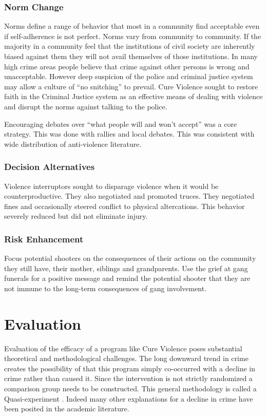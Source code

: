 \documentclass[11pt]{article}
\begin{document}
\subsubsection{Norm Change}
\label{sec-2-5-1}

Norms define a range of behavior that most in a community find acceptable even if self-adherence is 
not perfect.  Norms vary from community to community.  If the majority in a community feel that the 
institutions of civil society are inherently biased against them they will not avail themselves of 
those institutions.  In many high crime areas people believe that crime against other persons is 
wrong and unacceptable.  However deep suspicion of the police and criminal justice system may allow a
culture of ``no snitching'' to prevail.  Cure Violence sought to restore faith in the Criminal Justice
system as an effective means of dealing with violence and disrupt the norms against talking to the 
police.

Encouraging debates over ``what people will and won't accept'' was a core strategy.  This was
done with rallies and local debates.  This was consistent with wide distribution of anti-violence
literature.
\subsubsection{Decision Alternatives}
\label{sec-2-5-2}

Violence interruptors sought to disparage violence when it would be counterproductive.  They also 
negotiated and promoted truces.  They negotiated fines and occasionally steered conflict to 
physical altercations.  This behavior severely reduced but did not eliminate injury.

\subsubsection{Risk Enhancement}
\label{sec-2-5-3}

Focus potential shooters on the consequences of their actions on the community they still have, 
their mother, siblings and grandparents.  Use the grief at gang funerals for a positive message and 
remind the potential shooter that they are not immune to the long-term consequences of gang
involvement.
\section{Evaluation}
\label{sec-3}

Evaluation of the efficacy of a program like Cure Violence poses
substantial theoretical and methodological challenges. The long
downward trend in crime creates the possibility of that this program
simply co-occurred with a decline in crime rather than caused it.
Since the intervention is not strictly randomized a comparison group
needs to be constructed.  This general methodology is called a
Quasi-experiment \parencite{shadish}.  Indeed many other explanations
for a decline in crime have been posited in the academic literature.
\end{document}
